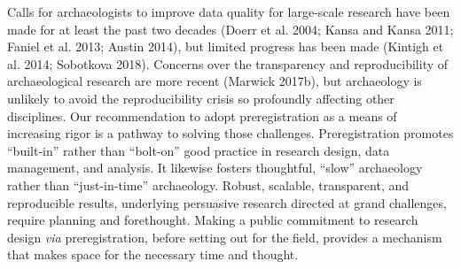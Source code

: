 \documentclass[article]{sa}
\begin{document}
Calls for archaeologists to improve data quality for large-scale
research have been made for at least the past two decades (Doerr et al.
2004; Kansa and Kansa 2011; Faniel et al. 2013; Austin 2014), but
limited progress has been made (Kintigh et al. 2014; Sobotkova 2018).
Concerns over the transparency and reproducibility of archaeological
research are more recent (Marwick 2017b), but archaeology is unlikely to
avoid the reproducibility crisis so profoundly affecting other
disciplines. Our recommendation to adopt preregistration as a means of
increasing rigor is a pathway to solving those challenges.
Preregistration promotes ``built-in'' rather than ``bolt-on'' good practice
in research design, data management, and analysis. It likewise fosters
thoughtful, ``slow'' archaeology rather than ``just-in-time'' archaeology.
Robust, scalable, transparent, and reproducible results, underlying
persuasive research directed at grand challenges, require planning and
forethought. Making a public commitment to research design \emph{via}
preregistration, before setting out for the field, provides a mechanism
that makes space for the necessary time and thought.

\nocite{*}

\end{document}
